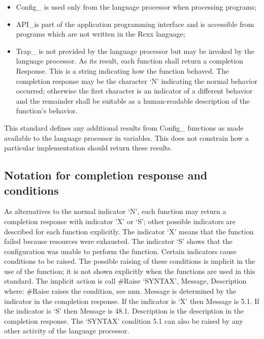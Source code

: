 \begin{itemize}
\item
  Config\_ is used only from the language processor when processing
  programs;
\item
  API\_is part of the application programming interface and is
  accessible from programs which are not written in the Rexx language;
\item
  Trap\_ is not provided by the language processor but may be invoked by
  the language processor. As its result, each function shall return a
  completion Response. This is a string indicating how the function
  behaved. The completion response may be the character `N' indicating
  the normal behavior occurred; otherwise the first character is an
  indicator of a different behavior and the remainder shall be suitable
  as a human-readable description of the function's behavior.
\end{itemize}

This standard defines any additional results from Config\_ functions as
made available to the language processor in variables. This does not
constrain how a particular implementation should return these results.

\hypertarget{notation-for-completion-response-and-conditions}{%
\subsection{Notation for completion response and
conditions}\label{notation-for-completion-response-and-conditions}}

As alternatives to the normal indicator `N', each function may return a
completion response with indicator 'X' or `S'; other possible indicators
are described for each function explicitly. The indicator `X' means that
the function failed because resources were exhausted. The indicator `S'
shows that the configuration was unable to perform the function. Certain
indicators cause conditions to be raised. The possible raising of these
conditions is implicit in the use of the function; it is not shown
explicitly when the functions are used in this standard. The implicit
action is call \#Raise `SYNTAX', Message, Description where: \#Raise
raises the condition, see nnn. Message is determined by the indicator in
the completion response. If the indicator is `X' then Message is 5.1. If
the indicator is `S' then Message is 48.1. Description is the
description in the completion response. The `SYNTAX' condition 5.1 can
also be raised by any other activity of the language processor.

